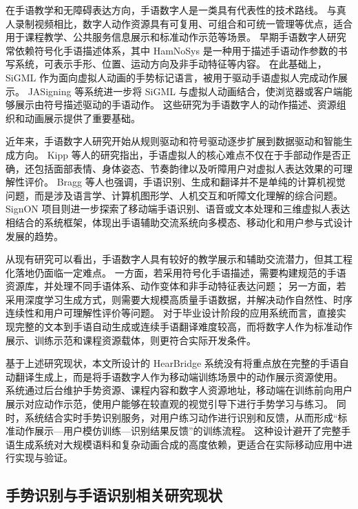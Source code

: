 在手语教学和无障碍表达方向，手语数字人是一类具有代表性的技术路线。
与真人录制视频相比，数字人动作资源具有可复用、可组合和可统一管理等优点，适合用于课程教学、公共服务信息展示和标准动作示范等场景。
早期手语数字人研究常依赖符号化手语描述体系，其中 HamNoSys 是一种用于描述手语动作参数的书写系统，可表示手形、位置、运动方向及非手动特征等内容\cite{hanke-hamnosys-2004}。
在此基础上，SiGML 作为面向虚拟人动画的手势标记语言，被用于驱动手语虚拟人完成动作展示\cite{elliott-sigml-2004}。
JASigning 等系统进一步将 SiGML 与虚拟人动画结合，使浏览器或客户端能够展示由符号描述驱动的手语动作\cite{uea-jasigning}。
这些研究为手语数字人的动作描述、资源组织和动画展示提供了重要基础。

近年来，手语数字人研究开始从规则驱动和符号驱动逐步扩展到数据驱动和智能生成方向。
Kipp 等人的研究指出，手语虚拟人的核心难点不仅在于手部动作是否正确，还包括面部表情、身体姿态、节奏韵律以及听障用户对虚拟人表达效果的可理解性评价\cite{kipp-sign-avatar-2011}。
Bragg 等人也强调，手语识别、生成和翻译并不是单纯的计算机视觉问题，而是涉及语言学、计算机图形学、人机交互和听障文化理解的综合问题\cite{bragg-sign-language-ai-2019}。
SignON 项目则进一步探索了移动端手语识别、语音或文本处理和三维虚拟人表达相结合的系统框架，体现出手语辅助交流系统向多模态、移动化和用户参与式设计发展的趋势\cite{signon-project}。

从现有研究可以看出，手语数字人具有较好的教学展示和辅助交流潜力，但其工程化落地仍面临一定难点。
一方面，若采用符号化手语描述，需要构建规范的手语资源库，并处理不同手语体系、动作变体和非手动特征表达问题；
另一方面，若采用深度学习生成方式，则需要大规模高质量手语数据，并解决动作自然性、时序连续性和用户可理解性评价等问题。
对于毕业设计阶段的应用系统而言，直接实现完整的文本到手语自动生成或连续手语翻译难度较高，而将数字人作为标准动作展示、训练示范和课程资源载体，则更符合实际开发条件。

基于上述研究现状，本文所设计的 HearBridge 系统没有将重点放在完整的手语自动翻译生成上，而是将手语数字人作为移动端训练场景中的动作展示资源使用。
系统通过后台维护手势资源、课程内容和数字人资源地址，移动端在训练前向用户展示对应动作示范，使用户能够在较直观的视觉引导下进行手势学习与练习。
同时，系统结合实时手势识别服务，对用户练习动作进行识别和反馈，从而形成“标准动作展示—用户模仿训练—识别结果反馈”的训练流程。
这种设计避开了完整手语生成系统对大规模语料和复杂动画合成的高度依赖，更适合在实际移动应用中进行实现与验证。

\subsection{手势识别与手语识别相关研究现状}

